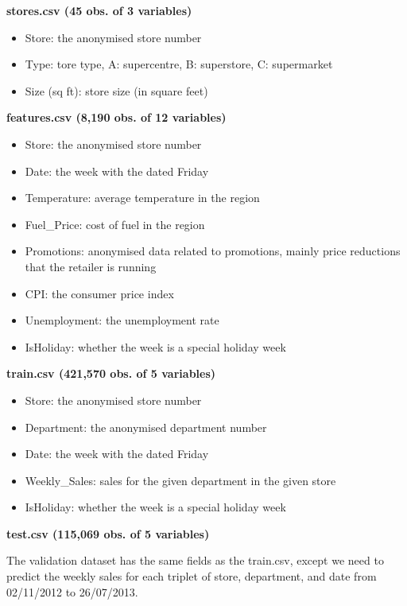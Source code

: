 \documentclass[11pt,]{article}
\providecommand{\tightlist}{%
  \setlength{\itemsep}{0pt}\setlength{\parskip}{0pt}}
\begin{document}
\textbf{stores.csv (45 obs. of 3 variables)}

\begin{itemize}
\tightlist
\item
  Store: the anonymised store number 
\item
  Type: tore type, A: supercentre, B: superstore, C: supermarket 
\item
  Size (sq ft): store size (in square feet) 
\end{itemize}

\textbf{features.csv (8,190 obs. of 12 variables)}

\begin{itemize}
\tightlist
\item
  Store: the anonymised store number 
\item
  Date: the week with the dated Friday 
\item
  Temperature: average temperature in the region 
\item
  Fuel\_Price: cost of fuel in the region 
\item
  Promotions: anonymised data related to promotions, mainly price
  reductions that the retailer is running 
\item
  CPI: the consumer price index 
\item
  Unemployment: the unemployment rate 
\item
  IsHoliday: whether the week is a special holiday week 
\end{itemize}

\textbf{train.csv (421,570 obs. of 5 variables)}

\begin{itemize}
\tightlist
\item
  Store: the anonymised store number 
\item
  Department: the anonymised department number 
\item
  Date: the week with the dated Friday 
\item
  Weekly\_Sales: sales for the given department in the given store 
\item
  IsHoliday: whether the week is a special holiday week 
\end{itemize}

\textbf{test.csv (115,069 obs. of 5 variables)}

The validation dataset has the same fields as the train.csv, except we
need to predict the weekly sales for each triplet of store, department,
and date from 02/11/2012 to 26/07/2013.
\end{document}
